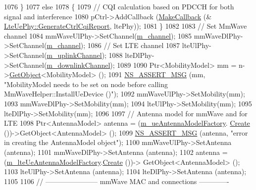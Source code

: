 \begin{DoxyCode}
1076         \}
1077         \textcolor{keywordflow}{else}
1078         \{
1079                 \textcolor{comment}{// CQI calculation based on PDCCH for both signal and interference}
1080                 pCtrl->AddCallback (\hyperlink{group__makecallbackmemptr_ga9376283685aa99d204048d6a4b7610a4}{MakeCallback} (&
      \hyperlink{classns3_1_1LteUePhy_a7eb062ce376b91b78d2bcfec9119c228}{LteUePhy::GenerateCtrlCqiReport}, ltePhy));
1081         \}
1082 
1083         \textcolor{comment}{// Set MmWave channel}
1084         mmWaveUlPhy->SetChannel(\hyperlink{classns3_1_1MmWaveHelper_adac6d83bc2acef8b7dbd9fc668207d95}{m\_channel});
1085         mmWaveDlPhy->SetChannel(\hyperlink{classns3_1_1MmWaveHelper_adac6d83bc2acef8b7dbd9fc668207d95}{m\_channel});
1086         \textcolor{comment}{// Set LTE channel}
1087         lteUlPhy->SetChannel(\hyperlink{classns3_1_1MmWaveHelper_a4f2b3aa855c0324fadfd5b174e240a66}{m\_uplinkChannel});
1088         lteDlPhy->SetChannel(\hyperlink{classns3_1_1MmWaveHelper_aa8d0ffe634d74e461d22d96afcec0239}{m\_downlinkChannel});
1089 
1090         Ptr<MobilityModel> mm = n->\hyperlink{classns3_1_1Object_a13e18c00017096c8381eb651d5bd0783}{GetObject}<MobilityModel> ();
1091         \hyperlink{assert_8h_aff5ece9066c74e681e74999856f08539}{NS\_ASSERT\_MSG} (mm, \textcolor{stringliteral}{"MobilityModel needs to be set on node before calling
       MmWaveHelper::InstallUeDevice ()"});
1092         mmWaveUlPhy->SetMobility(mm);
1093         mmWaveDlPhy->SetMobility(mm);
1094         lteUlPhy->SetMobility(mm);
1095         lteDlPhy->SetMobility(mm);
1096 
1097         \textcolor{comment}{// Antenna model for mmWave and for LTE}
1098         Ptr<AntennaModel> antenna = (\hyperlink{classns3_1_1MmWaveHelper_a8b7460b8578a56bb15f191983959b3ac}{m\_ueAntennaModelFactory}.
      \hyperlink{classns3_1_1ObjectFactory_a18152e93f0a6fe184ed7300cb31e9896}{Create} ())->GetObject<AntennaModel> ();
1099         \hyperlink{assert_8h_aff5ece9066c74e681e74999856f08539}{NS\_ASSERT\_MSG} (antenna, \textcolor{stringliteral}{"error in creating the AntennaModel object"});
1100         mmWaveUlPhy->SetAntenna (antenna);
1101         mmWaveDlPhy->SetAntenna (antenna);
1102         antenna = (\hyperlink{classns3_1_1MmWaveHelper_a543a845c12b4efc740350488d5eb6814}{m\_lteUeAntennaModelFactory}.\hyperlink{classns3_1_1ObjectFactory_a18152e93f0a6fe184ed7300cb31e9896}{Create} ())->
      GetObject<AntennaModel> ();
1103         lteUlPhy->SetAntenna (antenna);
1104         lteDlPhy->SetAntenna (antenna);
1105 
1106         \textcolor{comment}{// ----------------------- mmWave MAC and connections -------------}

\end{DoxyCode}
